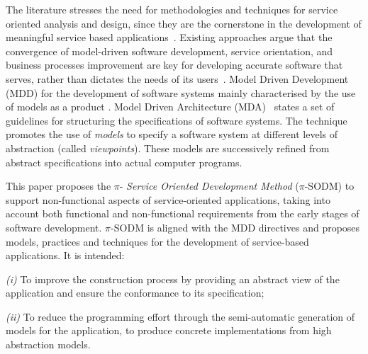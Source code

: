 




The literature stresses the need for methodologies and techniques for service oriented analysis and design, since they are the cornerstone in the development of meaningful service based applications~\cite{5}. Existing approaches argue that the convergence of model-driven software development, service orientation,   and  business processes improvement are key for developing accurate  software that serves, rather than dictates the needs of its users~\cite{watson}. Model Driven Development (MDD)  for the development of software systems mainly characterised by the use of models as a product \cite{Selic03}.
Model Driven Architecture (MDA)~\cite{miller} states a set of guidelines for structuring the specifications of software systems. The technique promotes  the use of \textit{models} to specify a software system at different levels of abstraction (called \textit{viewpoints}).
These models are successively refined from abstract specifications into actual computer programs.

This paper proposes  the $\pi$-\textit{ Service Oriented Development Method} ($\pi$-SODM)
to support non-functional aspects of service-oriented applications, taking into account both functional and non-functional requirements from the early stages of software development.
$\pi$-SODM is aligned with the MDD directives and proposes models, practices and techniques for the development of service-based applications. It is intended:
\begin{trivlist}
\item \textit{(i)} To improve the construction process by providing an abstract view of the application and ensure the conformance to its specification;
\item \textit{(ii)} To reduce the programming effort through the semi-automatic generation of  models for the application, to produce concrete implementations from high abstraction models.
\end{trivlist}

